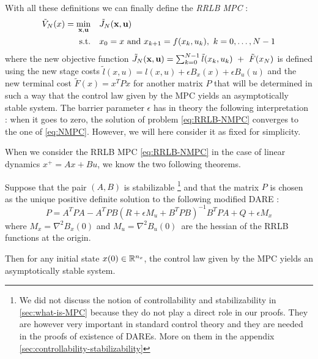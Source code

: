\documentclass[12pt]{article}
\begin{document}
\vspace{24pt}

\noindent With all these definitions we can finally define the \textit{RRLB MPC} :
\begin{align}
	\begin{split}\label{eq:RRLB-NMPC}
		\tilde{V}_N(x)=\underset{\bf{x},\bf{u}}{\min} &\quad \tilde{J}_N(\bf{x},\bf{u})\\
		\text{s.t.} &\quad x_0=x\text{ and }x_{k+1}=f(x_k,u_k),~k=0,\dots,N-1\\
	\end{split}
\end{align}
where the new objective function $\tilde{J}_N(\bf{x},\bf{u})=\sum_{k=0}^{N-1}\tilde{l}(x_k,u_k)~+~\tilde{F}(x_N)$ is defined using the new stage costs $\tilde{l}(x,u)=l(x,u)+\epsilon B_x(x)+\epsilon B_u(u)$ and the new terminal cost $\tilde{F}(x)=x^TPx$ for another matrix $P$ that will be determined in such a way that the control law given by the MPC yields an asymptotically stable system.
The barrier parameter $\epsilon$ has in theory the following interpretation : when it goes to zero, the solution of problem \ref{eq:RRLB-NMPC} converges to the one of \ref{eq:NMPC}.
However, we will here consider it as fixed for simplicity.

\vspace{12pt}

\noindent When we consider the RRLB MPC \ref{eq:RRLB-NMPC} in the case of linear dynamics $x^+=Ax+Bu$, we know the two following theorems.

\begin{theorem}
	\label{nominal-stability-linear-case}
	Suppose that the pair $(A,B)$ is stabilizable \footnote{We did not discuss the notion of controllability and stabilizability in \ref{sec:what-is-MPC} because they do not play a direct role in our proofs. They are however very important in standard control theory and they are needed in the proofs of existence of DAREs. More on them in the appendix \ref{sec:controllability-stabilizability}}
	and that the matrix $P$ is chosen as the unique positive definite solution to the following modified DARE :
	$$P=A^TPA-A^TPB(R+\epsilon M_u+B^TPB)^{-1}B^TPA+Q+\epsilon M_x$$
	where $M_x=\nabla^2 B_x(0)$ and $M_u=\nabla^2 B_u(0)$\, are the hessian of the RRLB functions at the origin.

	Then for any initial state $x(0)\in\R^{n_x}$, the control law given by the MPC yields an asymptotically stable system.
\end{theorem}
\end{document}
